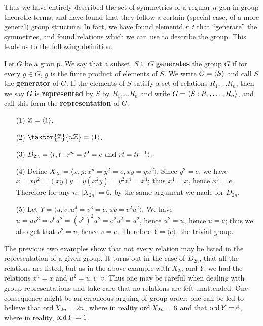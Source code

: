 Thus we have entirely described the set of symmetries of a regular $n$-gon in
group theoretic terms; and have found that they follow a certain  (special case,
of a more general) group structure. In fact, we have found elementd $r,t$ that
``generate'' the symmetries, and found relations which we can use to describe
the group. This leads us to the following definition.

\begin{definition}
  Let $G$ be a grou p. We say that a subset, $S \subseteq G$
  \textbf{generates} the group $G$ if for every  $g \in G$,  $g$ is the finite
  product of elements of  $S$. We write  $G=\langle S\rangle$ and call $S$ the
  \textbf{generator} of $G$. If the elements of  $S$ satisfy a set of
  relations  $R_1, \dots R_n$, then we say $G$ is  \textbf{represented} by $S$
  by $R_1, \dots R_n$ and write $G=\langle S : R_1, \dots, R_n\rangle$, and call
  this form the \textbf{representation} of $G$.
\end{definition}

\begin{example}
  \begin{enumerate}
    \item[(1)] $\mathbb{Z}= \langle 1 \rangle$.

    \item[(2)] $\faktor{\Z}{n\Z}=\langle 1 \rangle$.

    \item[(3)] $D_{2n}= \langle r,t : r^n=t^2=e \text{ and }
      rt=tr^{-1} \rangle$.

    \item[(4)] Define $X_{2n}=\langle x,y : x^n=y^2=e, xy=yx^2 \rangle$. Since
      $y^2=e$, we have  $x=xy^2=(xy)y=y(x^2y)=y^2x^4=x^4$; thus $x^4=x$,
      hence  $x^3=e$. Therefore  for any $n$, $|X_{2n}|=6$, by the
      same argument we made for $D_{2n}$.

    \item[(5)] Let $Y=\langle u,v : u^4=v^3=e, uv=v^2u^2 \rangle$. We have
      $u=uv^3=v^6u^2=(v^3)^2u^2=e^2u^2=u^2$, hence $u^2=u$, hence  $u=e$;
      thus we also get that  $v^2=v$, hence  $v=e$. Therefore
      $Y=\langle e \rangle$, the trivial group.
  \end{enumerate}
\end{example}

The previous two examples show that not every relation may be listed in the
representation of a given group. It turns out in the case of $D_{2n}$, that all
the relations are listed, but as in the above example with $X_{2n}$ and $Y$, we
had the relations $x^4=x$ and  $u^2=u, v^=v$. Thus one may be careful when
dealing with group representations and take care that no relations are left
unattended. One consequence might be an erroneous arguing of group order; one
can be led to believe that $\operatorname{ord}{X_{2n}}=2n$, where in reality $\operatorname{ord}{X_{2n}}=6$
and that $\operatorname{ord}{Y}=6$, where in reality, $\operatorname{ord}{Y}=1$.
